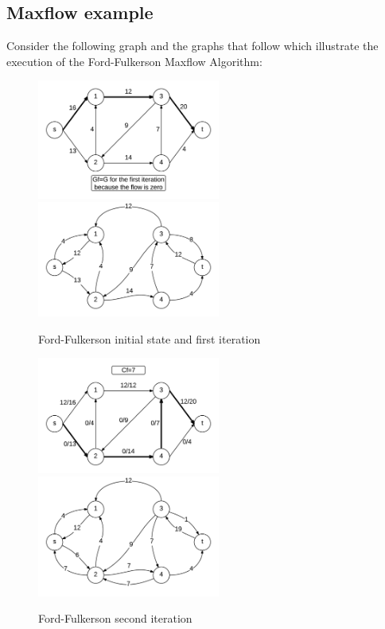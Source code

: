 \documentclass[12pt,letterpaper]{article}
\begin{document}
\subsection{Maxflow example}
Consider the following graph and the graphs that follow which illustrate the execution of the Ford-Fulkerson Maxflow Algorithm:

\begin{figure}[h]
\centering
\includegraphics[width=6cm]{mf0f}
\includegraphics[width=6cm]{mf0r}
\caption{Ford-Fulkerson initial state and first iteration}
\end{figure}
\begin{figure}[h]
\centering
\includegraphics[width=6cm]{mf1f}
\includegraphics[width=6cm]{mf1r}
\caption{Ford-Fulkerson second iteration}
\end{figure}
\end{document}
